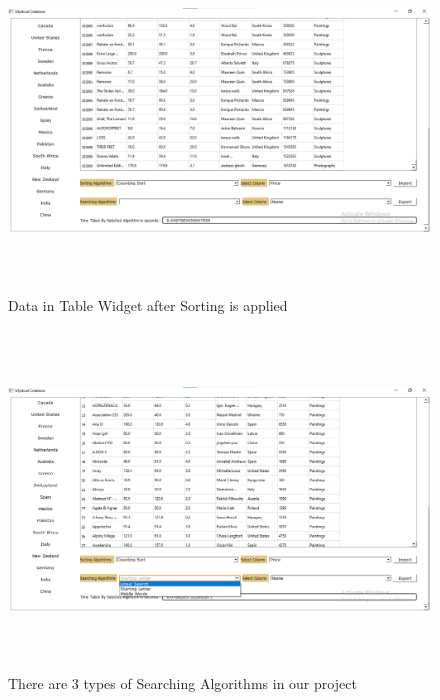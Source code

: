 \documentclass[12pt]{article}
\begin{document}
    \newpage
    \begin{figure}[ht!]
	    \includegraphics[width = 16cm, height = 9cm]{Sorted Data.png}
	    \renewcommand{\thefigure}{3.5}
	    \caption{Data in Table Widget after Sorting is applied}
    \end{figure}
    \begin{figure}[ht!]
	    \includegraphics[width = 16cm, height = 9cm]{Searching Algorithms.png}
	    \renewcommand{\thefigure}{3.6}
	    \caption{There are 3 types of Searching Algorithms in our project}
    \end{figure}
    
\end{document}
